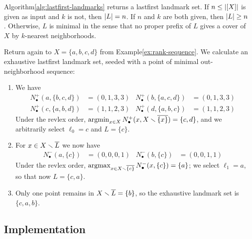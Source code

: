 \documentclass{article}
\begin{document}
\begin{proposition}
Algorithm\nbs\ref{alg:lastfirst-landmarks} returns a lastfirst landmark set.
If $n \leq \lvert [X]\rvert$ is given as input and $k$ is not, then $\lvert L\rvert = n$.
If $n$ and $k$ are both given, then $\lvert L\rvert \geq n$.
Otherwise, $L$ is minimal in the sense that no proper prefix of $L$ gives a cover of $X$ by $k$-nearest neighborhoods.
\end{proposition}

\begin{example}\label{ex:rank-sequence-order}
    Return again to $X=\{a,b,c,d\}$ from Example\nbs\ref{ex:rank-sequence}. We calculate an exhaustive lastfirst landmark set, seeded with a point of minimal out-neighborhood sequence:
    \begin{enumerate}
        \item We have
        \begin{align*}
            N_\bullet^+(a,\{b,c,d\}) &= (0,1,3,3) &
            N_\bullet^+(b,\{a,c,d\}) &= (0,1,3,3) \\
            N_\bullet^+(c,\{a,b,d\}) &= (1,1,2,3) &
            N_\bullet^+(d,\{a,b,c\}) &= (1,1,2,3)
        \end{align*}
        Under the revlex order, $\operatorname{argmin}_{x\in X}{N_\bullet^+(x,X \smallsetminus \overline{\{x\}})}=\{c,d\}$, and we arbitrarily select $\ell_0=c$ and $L=\{c\}$.
        \item For $x \in X \smallsetminus \overline{L}$ we now have
        \begin{align*}
            N_\bullet^-(a,\{c\}) &= (0,0,0,1) &
            N_\bullet^-(b,\{c\}) &= (0,0,1,1)
        \end{align*}
        Under the revlex order, $\operatorname{argmax}_{x\in X \smallsetminus \overline{\{c\}}}{N_\bullet^-(x,\{c\})}=\{a\}$; we select $\ell_1=a$, so that now $L=\{c,a\}$.
        \item Only one point remains in $X\smallsetminus \overline{L}=\{b\}$, so the exhaustive landmark set is $\{c,a,b\}$.
    \end{enumerate}
\end{example}

\hypertarget{implementation}{%
\subsection{Implementation}\label{implementation}}

\label{sec:implementation}
\end{document}
